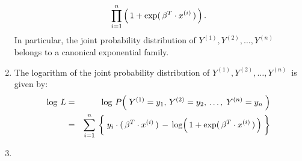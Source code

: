\begin{proposition}
\begin{enumerate}
\begin{eqnarray*}
{		}{
			\overset{n}{\underset{i=1}{\prod}} \left(\,\overset{{\color{white}.}}{1} + \exp(\,\beta^{T}\cdot x^{(i)}\,) \,\right)
		}\,.
	\end{eqnarray*}
	In particular, the joint probability distribution of \;$Y^{(1)},Y^{(2)},\ldots,Y^{(n)}$\, belongs to
	a canonical exponential family.
\item
	The logarithm of the joint probability distribution of
	\;$Y^{(1)},Y^{(2)},\ldots,Y^{(n)}$\, is given by:
	\begin{eqnarray*}
	\log\,L
		&=&
		\log\,P\!\left(\; Y^{(1)}=y_{1},\,Y^{(2)}=y_{2},\,\ldots,\;Y^{(n)}=y_{n} \;\right)
	\\
	&=&
		\overset{n}{\underset{i=1}{\sum}}\,
		\left\{\;
			y_{i}\cdot(\,\beta^{T} \cdot x^{(i)}\,)
			\, \overset{{\color{white}\vert}}{-} \,
			\log\!\left(\,1 + \exp(\,\beta^{T} \cdot x^{(i)}\,)\,\right)
			\;\right\}
	\end{eqnarray*}
\item\label{logisticScoreEqn}

\end{enumerate}
\end{proposition}
